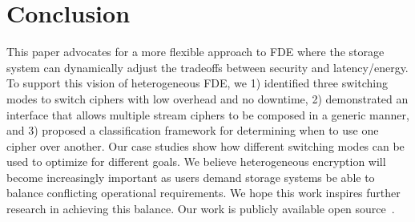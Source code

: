 \section{Conclusion}\label{sec:conclusion}

This paper advocates for a more flexible approach to FDE where the storage
system can dynamically adjust the tradeoffs between security and latency/energy.
To support this vision of heterogeneous FDE, we 1) identified three switching
modes to switch ciphers with low overhead and no downtime, 2) demonstrated an
interface that allows multiple stream ciphers to be composed in a generic
manner, and 3) proposed a classification framework for determining when to use
one cipher over another. Our case studies show how different switching modes can
be used to optimize for different goals. We believe heterogeneous encryption
will become increasingly important as users demand storage systems be able to
balance conflicting operational requirements. We hope this work inspires further
research in achieving this balance. Our work is publicly available open
source~.


